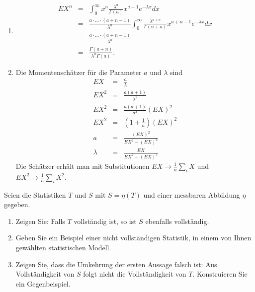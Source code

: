 \solution
\begin{enumerate}

    \item \begin{eqnarray*}
            E X^n &=& \int_{0}^{\infty} x^n \frac{\lambda^a}{\Gamma(a)}x^{a-1}e^{-\lambda x} dx \\
            &=& \frac{a \cdot\ldots\cdot \left( a+n-1 \right)}{\lambda^n} 
            \int_{0}^{\infty} \frac{\lambda^{a+n}}{\Gamma(n+a)} x^{a+n-1} e^{-\lambda x} dx \\
            &=& \frac{a\cdot \ldots \cdot \left( a+n-1 \right)}{\lambda^n} \\
            &=& \frac{\Gamma\left( a+n \right)}{ \lambda^n \Gamma\left( a \right)}.
        \end{eqnarray*}

    \item Die Momentenschätzer für die Parameter $a$ und $\lambda$ sind
        \begin{eqnarray*}
            E X &=& \frac{a}{\lambda} \\
            E X^2 &=&  \frac{a(a+1)}{\lambda^2} \\
            E X^2 &=&  \frac{a(a+1)}{a^2} \left( E X \right)^2 \\
            E X^2 &=& \left( 1 + \frac{1}{a} \right) \left( E X \right)^2 \\
            a &=& \frac{ \left( E X \right)^2 }{ E X^2 - \left( E X \right)^2}  \\
            \lambda &=&  \frac{ EX }{ E X^2 - \left( E X \right)^2} 
        \end{eqnarray*}
        Die Schätzer erhält man mit Substitutionen $EX \to \frac{1}{n} \sum_{i}^{} X$ und 
        $E X^2 \to \frac{1}{n} \sum_{i}^{} X^2$.


\end{enumerate}



 Seien die Statistiken $T$ und $S$ mit $S=\eta(T)$ und einer messbaren 
Abbildung $\eta$ gegeben. 
\begin{enumerate}
    \item Zeigen Sie: Falls $T$ vollständig ist, so ist $S$ ebenfalls vollständig.
    \item Geben Sie ein Beispiel einer nicht vollständigen Statistik, in einem von Ihnen
        gewählten statistischen Modell.
    \item Zeigen Sie, dass die Umkehrung der ersten Aussage falsch ist: Aus Vollständigkeit von $S$ 
        folgt nicht die Vollständigkeit von $T$. Konstruieren Sie ein Gegenbeispiel.
\end{enumerate}


